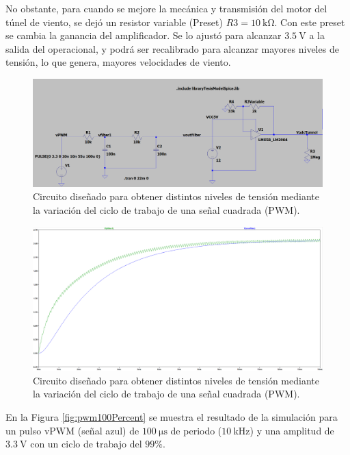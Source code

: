 No obstante, para cuando se mejore la mecánica y transmisión del motor del túnel de viento, se dejó un resistor variable (Preset) $R3=\SI{10}{\kilo\ohm}$. Con este preset se cambia la ganancia del amplificador. Se lo ajustó para alcanzar $\SI{3.5}{\volt}$ a la salida del operacional, y podrá ser recalibrado para alcanzar mayores niveles de tensión, lo que genera, mayores velocidades de viento.

\begin{figure}[H]
    \centering
    \includegraphics[width=1\linewidth]{Figuras/datalogger/Hardware/pwmCircuitSimulate.png}
    \caption{Circuito diseñado para obtener distintos niveles de tensión mediante la variación del ciclo de trabajo de una señal cuadrada (PWM).}
    \label{fig:pwmCircuitSimulate}
\end{figure}


\begin{figure}[H]
    \centering
    \includegraphics[width=1\linewidth]{Figuras/datalogger/Hardware/filter1and2.png}
    \caption{Circuito diseñado para obtener distintos niveles de tensión mediante la variación del ciclo de trabajo de una señal cuadrada (PWM).}
    \label{fig:filter1and2}
\end{figure}

En la Figura \ref{fig:pwm100Percent} se muestra el resultado de la simulación para un pulso $\text{vPWM}$ (señal azul) de $\SI{100}{\micro\second}$ de periodo ($\SI{10}{\kilo\hertz}$) y una amplitud de $\SI{3.3}{\volt}$ con un ciclo de trabajo del $99\%$.

